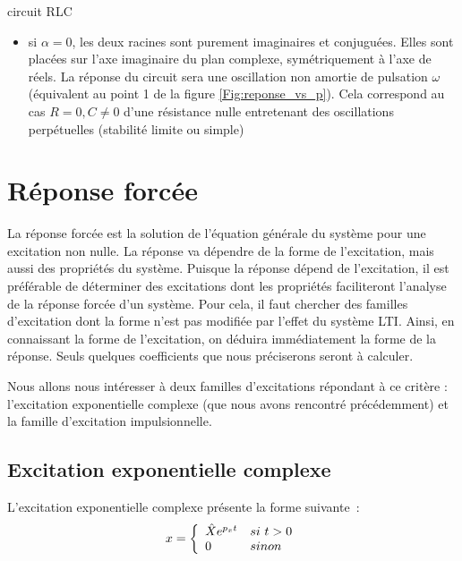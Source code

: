 \begin{remark}{}
\begin{exemple}{circuit RLC}
\begin{itemize}
          racines sont conjuguées. Elles sont situées à gauche de
          l'axe des imaginaires dans le plan complexe. La réponse du circuit
          sera du type oscillation amortie de pulsation
          $\sqrt{\omega^{2}-\alpha^{2}}$ (équivalent au point 4 de la
          figure \ref{Fig:reponse_vs_p}).
        \item si $\alpha = 0$, les deux racines sont purement
          imaginaires et conjuguées. Elles sont placées sur l'axe
          imaginaire du plan complexe, symétriquement à l'axe de réels. La
          réponse du circuit sera une oscillation non amortie de
          pulsation $\omega$ (équivalent au point 1 de la figure
          \ref{Fig:reponse_vs_p}).  Cela correspond au cas 
           $R=0, C\neq 0$ d'une résistance nulle
          entretenant des oscillations perpétuelles (stabilité limite
          ou simple)
	\end{itemize}
      \end{exemple}
	
	\section{Réponse forcée}
	
	La réponse forcée est la solution de l'équation générale du
        système pour une excitation non nulle. La réponse va dépendre
        de la forme de l'excitation, mais aussi des propriétés du
        système. Puisque la réponse dépend de l'excitation, il est
        préférable de déterminer des excitations dont les propriétés
        faciliteront l'analyse de la réponse forcée d'un système. Pour
        cela, il faut chercher des familles d'excitation dont la forme
        n'est pas modifiée par l'effet du système LTI. Ainsi, en
        connaissant la forme de l'excitation, on déduira immédiatement
        la forme de la réponse. Seuls quelques coefficients que nous
        préciserons seront à calculer.
	
	Nous allons nous intéresser à deux familles d'excitations
        répondant à ce critère : l'excitation exponentielle complexe
        (que nous avons rencontré précédemment) et la famille
        d'excitation impulsionnelle.
	
	\subsection{Excitation exponentielle complexe}
	L'excitation exponentielle complexe présente la forme suivante~:
	\begin{equation}\label{eq:exc_expo_complexe}
          x =    \left \{
            \begin{array}{l l}
              \hat{X}  e^{p_{x}t}  & si~t>0 \\
              0   & sinon \\
            \end{array}
          \right .
	\end{equation}
	

\end{remark}
